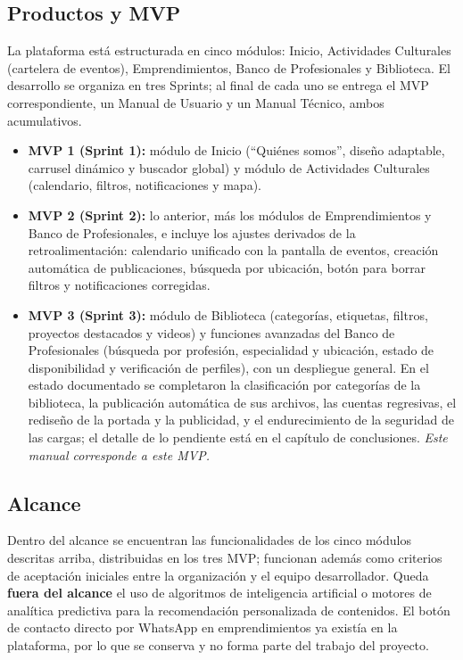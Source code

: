 \subsection{Productos y MVP}
La plataforma está estructurada en cinco módulos: Inicio, Actividades Culturales (cartelera de eventos), Emprendimientos, Banco de Profesionales y Biblioteca. El desarrollo se organiza en tres Sprints; al final de cada uno se entrega el MVP correspondiente, un Manual de Usuario y un Manual Técnico, ambos acumulativos.
\begin{itemize}
    \item \textbf{MVP 1 (Sprint 1):} módulo de Inicio (``Quiénes somos'', diseño adaptable, carrusel dinámico y buscador global) y módulo de Actividades Culturales (calendario, filtros, notificaciones y mapa).
    \item \textbf{MVP 2 (Sprint 2):} lo anterior, más los módulos de Emprendimientos y Banco de Profesionales, e incluye los ajustes derivados de la retroalimentación: calendario unificado con la pantalla de eventos, creación automática de publicaciones, búsqueda por ubicación, botón para borrar filtros y notificaciones corregidas.
    \item \textbf{MVP 3 (Sprint 3):} módulo de Biblioteca (categorías, etiquetas, filtros, proyectos destacados y videos) y funciones avanzadas del Banco de Profesionales (búsqueda por profesión, especialidad y ubicación, estado de disponibilidad y verificación de perfiles), con un despliegue general. En el estado documentado se completaron la clasificación por categorías de la biblioteca, la publicación automática de sus archivos, las cuentas regresivas, el rediseño de la portada y la publicidad, y el endurecimiento de la seguridad de las cargas; el detalle de lo pendiente está en el capítulo de conclusiones. \textit{Este manual corresponde a este MVP.}
\end{itemize}

\subsection{Alcance}
Dentro del alcance se encuentran las funcionalidades de los cinco módulos descritas arriba, distribuidas en los tres MVP; funcionan además como criterios de aceptación iniciales entre la organización y el equipo desarrollador. Queda \textbf{fuera del alcance} el uso de algoritmos de inteligencia artificial o motores de analítica predictiva para la recomendación personalizada de contenidos. El botón de contacto directo por WhatsApp en emprendimientos ya existía en la plataforma, por lo que se conserva y no forma parte del trabajo del proyecto.

